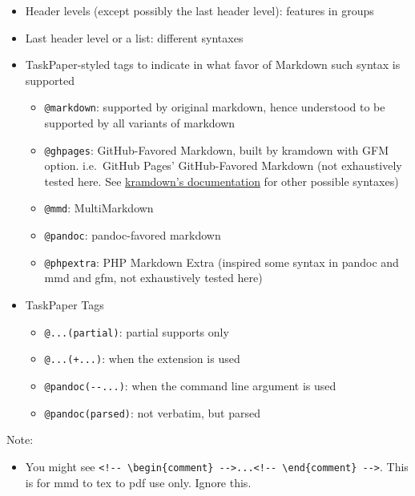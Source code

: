 \documentclass[]{article}
\providecommand{\tightlist}{%
  \setlength{\itemsep}{0pt}\setlength{\parskip}{0pt}}
\begin{document}
\begin{itemize}
\tightlist
\item
  Header levels (except possibly the last header level): features in
  groups
\item
  Last header level or a list: different syntaxes
\item
  TaskPaper-styled tags to indicate in what favor of Markdown such
  syntax is supported

  \begin{itemize}
  \tightlist
  \item
    \texttt{@markdown}: supported by original markdown, hence understood
    to be supported by all variants of markdown
  \item
    \texttt{@ghpages}: GitHub-Favored Markdown, built by kramdown with
    GFM option. i.e.~GitHub Pages' GitHub-Favored Markdown (not
    exhaustively tested here. See
    \href{http://kramdown.gettalong.org/syntax.html\#tables}{kramdown's
    documentation} for other possible syntaxes)
  \item
    \texttt{@mmd}: MultiMarkdown~
  \item
    \texttt{@pandoc}: pandoc-favored markdown
  \item
    \texttt{@phpextra}: PHP Markdown Extra (inspired some syntax in
    pandoc and mmd and gfm, not exhaustively tested here)
  \end{itemize}
\item
  TaskPaper Tags

  \begin{itemize}
  \tightlist
  \item
    \texttt{@...(partial)}: partial supports only
  \item
    \texttt{@...(+...)}: when the extension is used
  \item
    \texttt{@pandoc(-\/-...)}: when the command line argument is used
  \item
    \texttt{@pandoc(parsed)}: not verbatim, but parsed
  \end{itemize}
\end{itemize}

Note:

\begin{itemize}
\tightlist
\item
  You might see
  \texttt{\textless{}!-\/-\ \textbackslash{}begin\{comment\}\ -\/-\textgreater{}...\textless{}!-\/-\ \textbackslash{}end\{comment\}\ -\/-\textgreater{}}.
  This is for mmd to tex to pdf use only. Ignore this.
\end{itemize}
\end{document}
